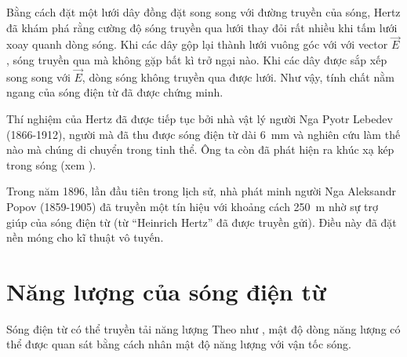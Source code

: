 Bằng cách đặt một lưới dây đồng đặt song song với đường truyền của sóng, Hertz đã khám phá rằng cường độ sóng truyền qua lưới thay đỏi rất nhiều khi tấm lưới xoay quanh dòng sóng. Khi các dây gộp lại thành lưới vuông góc với với vector $\vec{E}$, sóng truyền qua mà không gặp bất kì trở ngại nào.
Khi các dây được sắp xếp song song với $\vec{E}$, dòng sóng không truyền qua được lưới.
Như vậy, tính chất nằm ngang của sóng điện từ đã được chứng minh.


Thí nghiệm của Hertz đã được tiếp tục bởi nhà vật lý người Nga Pyotr Lebedev (1866-1912), người mà đã thu được sóng điện từ dài \SI{6}{\milli\metre} và nghiên cứu làm thế nào mà chúng di chuyển trong tinh thể.
Ông ta còn đã phát hiện ra khúc xạ kép trong sóng (xem ).


Trong năm 1896, lần đầu tiên trong lịch sử, nhà phát minh người Nga Aleksandr Popov (1859-1905) đã truyền một tín hiệu với khoảng cách \SI{250}{\metre} nhờ sự trợ giúp của sóng điện từ (từ ``Heinrich Hertz'' đã được truyền gửi).
Điều này đã đặt nền móng cho kĩ thuật vô tuyến.


\section{Năng lượng của sóng điện từ}\label{sec:15_4}


Sóng điện từ có thể truyền tải năng lượng
Theo như , mật độ dòng năng lượng có thể được quan sát bằng cách nhân mật độ năng lượng với vận tốc sóng.


